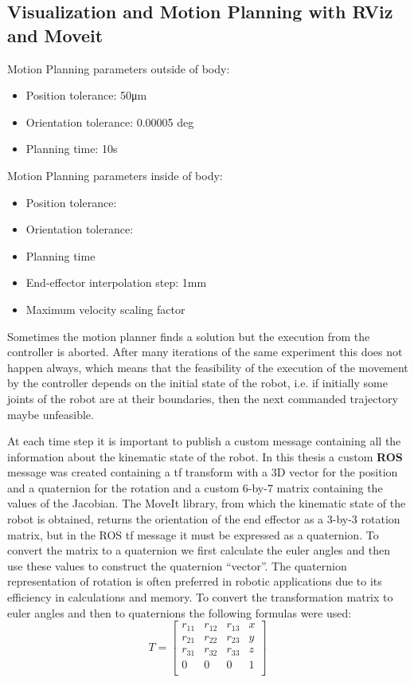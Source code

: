 \subsection{Visualization and Motion Planning with RViz and Moveit}

Motion Planning parameters outside of body:
\begin{itemize}
	\item Position tolerance: 50μm
	\item Orientation tolerance: 0.00005 deg
	\item Planning time: 10s
\end{itemize}

Motion Planning parameters inside of body:
\begin{itemize}
	\item Position tolerance:
	\item Orientation tolerance:
	\item Planning time
	\item End-effector interpolation step: 1mm
	\item Maximum velocity scaling factor
\end{itemize}

Sometimes the motion planner finds a solution but the execution from the controller is aborted. 
After many iterations of the same experiment this does not happen always, which means that the 
feasibility of the execution of the movement by the controller depends on the initial state of 
the robot, i.e. if initially some joints of the robot are at their boundaries, then the next 
commanded trajectory maybe unfeasible.

At each time step it is important to publish a custom message containing all the information 
about the kinematic state of the robot. In this thesis a custom \textbf{ROS} message was created 
containing a tf transform with a 3D vector for the position and a quaternion for the rotation and 
a custom  6-by-7 matrix containing the values of the Jacobian. The MoveIt library, from which the 
kinematic state of the robot is obtained, returns the orientation of the end effector as a 3-by-3 
rotation matrix, but in the ROS tf message it must be expressed as a quaternion. To convert the 
matrix to a quaternion we first calculate the euler angles and then use these values to construct 
the quaternion “vector”. The quaternion representation of rotation is often preferred in robotic 
applications due to its efficiency in calculations and memory. To convert the transformation 
matrix to euler angles and then to quaternions the following formulas were used:
\[
T = 
\begin{bmatrix}
r_{11} & r_{12} & r_{13} & x \\
r_{21} & r_{22} & r_{23} & y \\
r_{31} & r_{32} & r_{33} & z \\
0 & 0 & 0 & 1\\
\end{bmatrix}
\]

